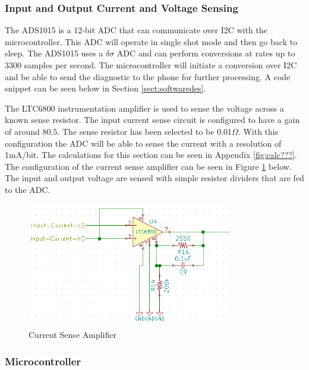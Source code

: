\documentclass{article}
\numberwithin{figure}{section}
\numberwithin{equation}{section}
\begin{document}
{\subsubsection{Input and Output Current and Voltage Sensing}

The ADS1015 is a 12-bit ADC that can communicate over I2C with the microcontroller. This ADC will operate in single shot mode and then go back to sleep. The ADS1015 uses a $\delta\sigma$ ADC and can perform conversions at rates up to 3300 samples per second. The microcontroller will initiate a conversion over I2C and be able to send the diagnostic to the phone for further processing. A code snippet can be seen below in Section \ref{sect:softwaredes}.

The LTC6800 instrumentation amplifier is used to sense the voltage across a known sense resistor. The input current sense circuit is configured to have a gain of around 80.5. The sense resistor has been selected to be 0.01$\Omega$. With this configuration the ADC will be able to sense the current with a resolution of 1mA/bit. The calculations for this section can be seen in Appendix \ref{fig:calc???}. The configuration of the current sense amplifier can be seen in Figure \ref{fig:AV} below. The input and output voltage are sensed with simple resistor dividers that are fed to the ADC.
\begin{figure}[H]
	\centering
	\includegraphics[width=0.8\textwidth]{AtoV}
	\caption{Current Sense Amplifier}
	\label{fig:AV}
\end{figure}

\subsubsection{Microcontroller}

}
\end{document}
